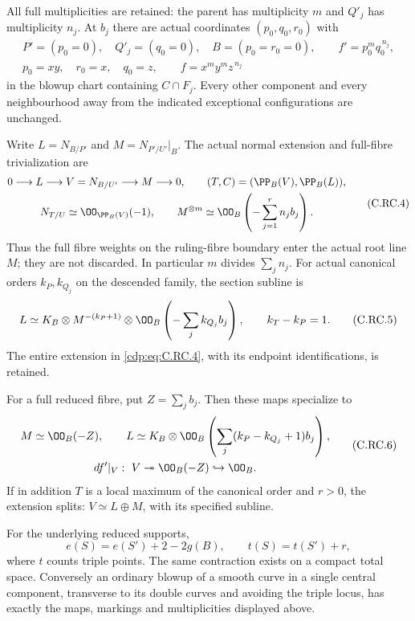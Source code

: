 \begin{proposition}
All full multiplicities are retained: the parent
has multiplicity $m$ and $Q'_j$ has multiplicity
$n_j$. At $b_j$ there are actual coordinates
$(p_0,q_0,r_0)$ with
\[
 \begin{gathered}
 P'=(p_0=0),\quad Q'_j=(q_0=0),\quad
 B=(p_0=r_0=0),\qquad f'=p_0^m q_0^{\,n_j},\\
 p_0=xy,\quad r_0=x,\quad q_0=z,\qquad
                         f=x^m y^m z^{\,n_j}
 \end{gathered}
\tag{C.RC.3}\label{cdp:eq:C.RC.3}
\]
in the blowup chart containing $C\cap F_j$.
Every other component and every neighbourhood away
from the indicated exceptional configurations are
unchanged.

Write
$L=N_{B/P'}$ and $M=N_{P'/U'}|_B$.
The actual normal extension and full-fibre
trivialization are
\[
 \begin{gathered}
 0\longrightarrow L\longrightarrow
       V=N_{B/U'}\longrightarrow M\longrightarrow0,
 \qquad (T,C)=(\PP_B(V),\PP_B(L)),\\
 N_{T/U}\simeq\OO_{\PP_B(V)}(-1),\qquad
 M^{\otimes m}\simeq
             \OO_B\left(-\sum_{j=1}^r n_jb_j\right).
 \end{gathered}
\tag{C.RC.4}\label{cdp:eq:C.RC.4}
\]
Thus the full fibre weights on the ruling-fibre
boundary enter the actual root line $M$; they are
not discarded. In particular $m$ divides
$\sum_jn_j$. For actual canonical orders $k_P,k_{Q_j}$
on the descended family, the section subline is
\[
 L\simeq K_B\otimes M^{-(k_P+1)}
                    \otimes\OO_B\left(-\sum_jk_{Q_j}b_j\right),
             \qquad k_T-k_P=1.
\tag{C.RC.5}\label{cdp:eq:C.RC.5}
\]
The entire extension in \eqref{cdp:eq:C.RC.4}, with its endpoint
identifications, is retained.

For a full reduced fibre, put $Z=\sum_jb_j$. Then
these maps specialize to
\[
 \begin{gathered}
 M\simeq\OO_B(-Z),\qquad
 L\simeq K_B\otimes
              \OO_B\left(\sum_j(k_P-k_{Q_j}+1)b_j\right),\\
 df'|_V:\ V\twoheadrightarrow
            \OO_B(-Z)\hookrightarrow\OO_B.
 \end{gathered}
\tag{C.RC.6}\label{cdp:eq:C.RC.6}
\]
If in addition $T$ is a local maximum of the
canonical order and $r>0$, the extension splits:
$V\simeq L\oplus M$, with its specified subline.

For the underlying reduced supports,
\[
              e(S)=e(S')+2-2g(B),\qquad
              t(S)=t(S')+r,
\tag{C.RC.7}\label{cdp:eq:C.RC.7}
\]
where $t$ counts triple points. The same contraction
exists on a compact total space. Conversely an
ordinary blowup of a smooth curve in a single
central component, transverse to its double curves
and avoiding the triple locus, has exactly the
maps, markings and multiplicities displayed above.
\end{proposition}

